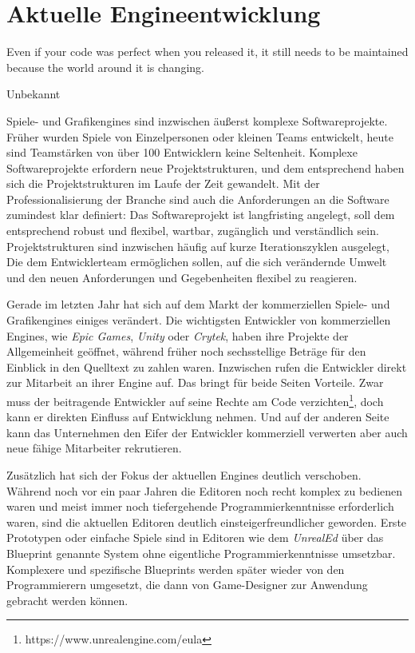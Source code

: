 \chapter{Aktuelle Engineentwicklung}
\label{chap:engine-uebersicht}

\epigraph{Even if your code was perfect when you released it, it still needs to be maintained because the world around it is changing.}{Unbekannt}

Spiele- und Grafikengines sind inzwischen äußerst komplexe Softwareprojekte. Früher wurden Spiele von Einzelpersonen oder kleinen Teams entwickelt, heute sind Teamstärken von über 100 Entwicklern keine Seltenheit. Komplexe Softwareprojekte erfordern neue Projektstrukturen, und dem entsprechend haben sich die Projektstrukturen im Laufe der Zeit gewandelt. Mit der Professionalisierung der Branche sind auch die Anforderungen an die Software zumindest klar definiert: Das Softwareprojekt ist langfristing angelegt, soll dem entsprechend robust und flexibel, wartbar, zugänglich und verständlich sein. Projektstrukturen sind inzwischen häufig auf kurze Iterationszyklen ausgelegt, Die dem Entwicklerteam ermöglichen sollen, auf die sich verändernde Umwelt und den neuen Anforderungen und Gegebenheiten flexibel zu reagieren.

Gerade im letzten Jahr hat sich auf dem Markt der kommerziellen Spiele- und Grafikengines einiges verändert. Die wichtigsten Entwickler von kommerziellen Engines, wie \textit{Epic Games}, \textit{Unity} oder \textit{Crytek}, haben ihre Projekte der Allgemeinheit geöffnet, während früher noch sechsstellige Beträge für den Einblick in den Quelltext zu zahlen waren. Inzwischen rufen die Entwickler direkt zur Mitarbeit an ihrer Engine auf. Das bringt für beide Seiten Vorteile. Zwar muss der beitragende Entwickler auf seine Rechte am Code verzichten\footnote{https://www.unrealengine.com/eula}, doch kann er direkten Einfluss auf Entwicklung nehmen. Und auf der anderen Seite kann das Unternehmen den Eifer der Entwickler kommerziell verwerten aber auch neue fähige Mitarbeiter rekrutieren.

Zusätzlich hat sich der Fokus der aktuellen Engines deutlich verschoben. Während noch vor ein paar Jahren die Editoren noch recht komplex zu bedienen waren und meist immer noch tiefergehende Programmierkenntnisse erforderlich waren, sind die aktuellen Editoren deutlich einsteigerfreundlicher geworden. Erste Prototypen oder einfache Spiele sind in Editoren wie dem \textit{UnrealEd} über das Blueprint genannte System ohne eigentliche Programmierkenntnisse umsetzbar. Komplexere und spezifische Blueprints werden später wieder von den Programmierern umgesetzt, die dann von Game-Designer zur Anwendung gebracht werden können.

